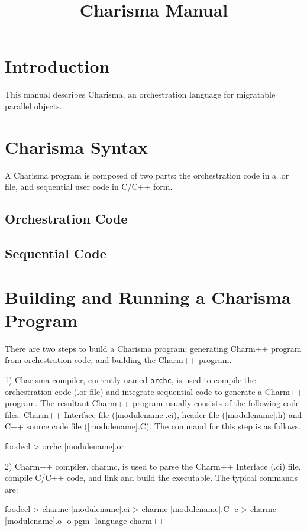 \documentclass[10pt]{article}
\title{Charisma Manual}
\def\smallfbox#1{{\small {\fbox{#1}}}}
\def\code#1{{\small {\tt {#1}}}}
\begin{document}
\maketitle

\section{Introduction}

This manual describes Charisma, an orchestration language for migratable
parallel objects. 

\section{Charisma Syntax}
A Charisma program is composed of two parts: the orchestration code in a .or
file, and sequential user code in C/C++ form. 

\subsection{Orchestration Code}


\subsection{Sequential Code}
\label{sec:sequential}


\section{Building and Running a Charisma Program}
There are two steps to build a Charisma program: generating Charm++ program 
from orchestration code, and building the Charm++ program. 

1) Charisma compiler, currently named \code{orchc}, is used to compile the
orchestration code (.or file) and integrate sequential code to generate a
Charm++ program. The resultant Charm++ program usually consists of the 
following code files: Charm++ Interface file ([modulename].ci), header file 
([modulename].h) and C++ source code file ([modulename].C). The command 
for this step is as follows.

\begin{SaveVerbatim}{foodecl}
    > orchc [modulename].or
\end{SaveVerbatim}
\smallfbox{\BUseVerbatim{foodecl}}

2) Charm++ compiler, charmc, is used to parse the Charm++ Interface (.ci) file,
compile C/C++ code, and link and build the executable. The typical commands are:
\begin{SaveVerbatim}{foodecl}
    > charmc [modulename].ci
    > charmc [modulename].C -c
    > charmc [modulename].o -o pgm -language charm++
\end{SaveVerbatim}
\smallfbox{\BUseVerbatim{foodecl}}
\end{document}
